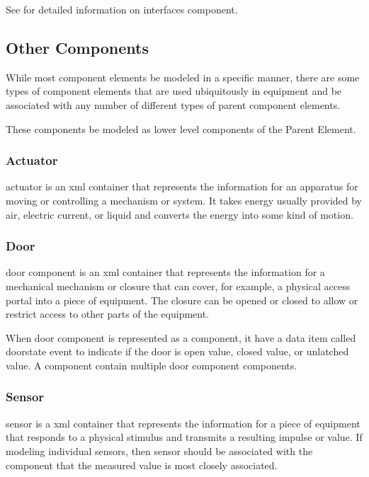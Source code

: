See  for detailed information on \gls{interfaces component}.

\subsection{Other Components}

While most component elements \should be modeled in a specific manner, there are some types of component elements that are used ubiquitously in equipment and \may be associated with any number of different types of parent component elements.

These components \may be modeled as \gls{lower level} components of the Parent Element.

\subsubsection{Actuator}

\gls{actuator} is an \gls{xml} container that represents the information for an apparatus for moving or controlling a mechanism or system.  It takes energy usually provided by air, electric current, or liquid and converts the energy into some kind of motion.  

\subsubsection{Door}

\gls{door component} is an \gls{xml} container that represents the information for a mechanical mechanism or closure that can cover, for example, a physical access portal into a piece of equipment.  The closure can be opened or closed to allow or restrict access to other parts of the equipment.

When \gls{door component} is represented as a \gls{component}, it \must have a data item called \gls{doorstate event} to indicate if the door is \gls{open value}, \gls{closed value}, or \gls{unlatched value}.  A \gls{component} \may contain multiple \gls{door component} components.

\newpage

\subsubsection{Sensor}
\label{sec:Sensor}

\gls{sensor} is a \gls{xml} container that represents the information for a piece of equipment that responds to a physical stimulus and transmits a resulting impulse or value.  If modeling individual sensors, then sensor should be associated with the component that the measured value is most closely associated.   

